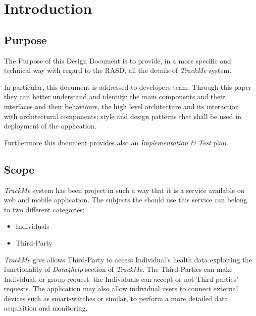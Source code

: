 \documentclass[a4paper]{article}
\begin{document}

\tableofcontents
{}

\newpage
\pagestyle{fancy}

\section{Introduction}

\subsection{Purpose}
    The Purpose of this Design Document is to provide, in a more specific and technical way with regard to the RASD, all the details of \textit{TrackMe} system.
    
    In particular, this document is addressed to  developers team. Through this paper they can better understand and identify: the main components and their interfaces and their behaviours, the high level architecture and its interaction with architectural components; style and design patterns that shall be used in deployment of the application.
    
    Furthermore this document provides also an \textit{Implementation \& Test} plan.
 
    \subsection{Scope}
    \textit{TrackMe} system has been project in such a way that it is a service available on web and mobile application. The subjects the should use this service can belong to two different categories:
    
    \begin{itemize}
    
    \item{Individuals}
    
    \item{Third-Party}
    
    \end{itemize}
    
   
   \textit{TrackMe} give allows Third-Party to access Individual's health data exploiting the functionality of \textit{Data4help} section of \textit{TrackMe}. The Third-Parties can make Individual, or group request. the Individuals  can accept or not Third-parties' requests. The application may also allow individual users to connect external  devices such as smart-watches or similar, to perform a more detailed data acquisition and monitoring. 
   
\end{document}
